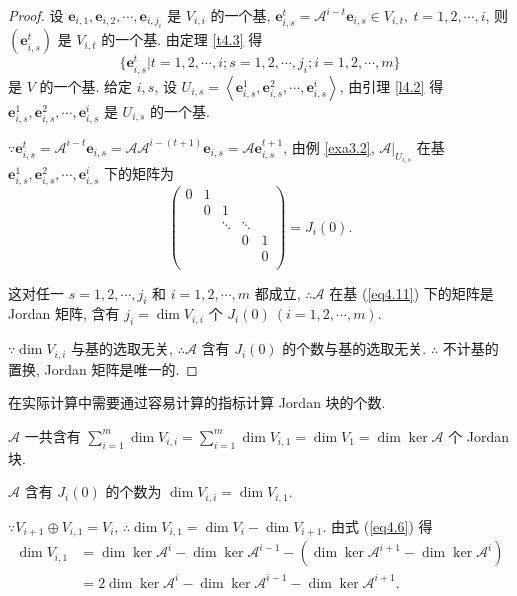 \documentclass[color=black,device=normal,lang=cn,mode=geye]{elegantnote}
\begin{document}
\begin{proof}
    设 $\boldsymbol{e}_{i,1},\boldsymbol{e}_{i,2},\cdots,\boldsymbol{e}_{i,j_i}$ 是 $V_{i,i}$ 的一个基, $\boldsymbol{e}_{i,s}^t=\mathcal{A}^{i-t}\boldsymbol{e}_{i,s}\in V_{i,t},\ t=1,2,\cdots,i$, 则 $(\boldsymbol{e}_{i,s}^t)$ 是 $V_{i,t}$ 的一个基. 由定理 \ref{t4.3} 得
    \begin{equation}\label{eq4.11}
        \{\boldsymbol{e}_{i,s}^t|t=1,2,\cdots,i;s=1,2,\cdots,j_i;i=1,2,\cdots,m\}
    \end{equation}
    是 $V$ 的一个基. 给定 $i,s$, 设 $U_{i,s}=\left<\boldsymbol{e}_{i,s}^1,\boldsymbol{e}_{i,s}^2,\cdots,\boldsymbol{e}_{i,s}^i\right>$, 由引理 \ref{l4.2} 得 $\boldsymbol{e}_{i,s}^1,\boldsymbol{e}_{i,s}^2,\cdots,\boldsymbol{e}_{i,s}^i$ 是 $U_{i,s}$ 的一个基.
    
    $\because\boldsymbol{e}_{i,s}^t=\mathcal{A}^{i-t}\boldsymbol{e}_{i,s}=\mathcal{A}\mathcal{A}^{i-(t+1)}\boldsymbol{e}_{i,s}=\mathcal{A}\boldsymbol{e}_{i,s}^{t+1}$, 由例 \ref{exa3.2}, $\mathcal{A}|_{U_{i,s}}$ 在基 $\boldsymbol{e}_{i,s}^1,\boldsymbol{e}_{i,s}^2,\cdots,\boldsymbol{e}_{i,s}^i$ 下的矩阵为
    \[\begin{pmatrix}
        0 & 1 \\
        & 0 & 1 \\
        && \ddots & \ddots \\
        &&& 0 & 1 \\
        &&&& 0 \\
    \end{pmatrix}=J_i(0).\]

    这对任一 $s=1,2,\cdots,j_i$ 和 $i=1,2,\cdots,m$ 都成立, $\therefore\mathcal{A}$ 在基 (\ref{eq4.11}) 下的矩阵是 Jordan 矩阵, 含有 $j_i=\dim V_{i,i}$ 个 $J_i(0)\ (i=1,2,\cdots,m)$.

    $\because\dim V_{i,i}$ 与基的选取无关, $\therefore\mathcal{A}$ 含有 $J_i(0)$ 的个数与基的选取无关. $\therefore$ 不计基的置换, Jordan 矩阵是唯一的.
\end{proof}
\begin{note}
    在实际计算中需要通过容易计算的指标计算 Jordan 块的个数.

    $\mathcal{A}$ 一共含有 $\sum\limits_{i=1}^m\dim V_{i,i}=\sum\limits_{i=1}^m\dim V_{i,1}=\dim V_1=\dim\ker\mathcal{A}$ 个 Jordan 块.

    $\mathcal{A}$ 含有 $J_i(0)$ 的个数为 $\dim V_{i,i}=\dim V_{i,1}$.
    
    $\because V_{i+1}\oplus V_{i,1}=V_i$, $\therefore\dim V_{i,1}=\dim V_i-\dim V_{i+1}$. 由式 (\ref{eq4.6}) 得
    \begin{align*}
        \dim V_{i,1} & =\dim\ker\mathcal{A}^i-\dim\ker\mathcal{A}^{i-1}-(\dim\ker\mathcal{A}^{i+1}-\dim\ker\mathcal{A}^i) \\
        & =2\dim\ker\mathcal{A}^i-\dim\ker\mathcal{A}^{i-1}-\dim\ker\mathcal{A}^{i+1}.
    \end{align*}
\end{note}
\end{document}
